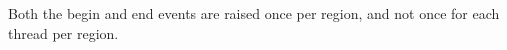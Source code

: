 Both the begin and end events are raised once per region,
and not once for each thread per region.



